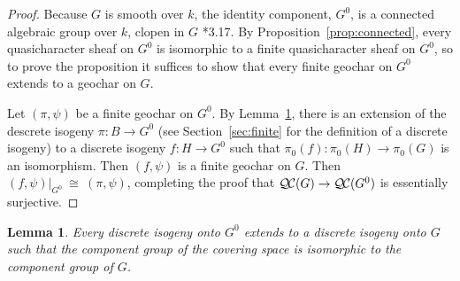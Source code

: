 \documentclass[11pt]{amsart}
\theoremstyle{plain}
\newtheorem{lemma}[theorem]{Lemma}
\theoremstyle{definition}
\theoremstyle{remark}
\newcommand{\Fq}{k}
\newcommand{\iso}{{\ \cong\ }}
\newcommand{\QC}{{\mathcal{Q\hskip-0.8pt C}}}
\begin{document}
\begin{proof}
  Because $G$ is smooth over $\Fq$, the identity component, 
  $G^0$, is a connected algebraic group over $\Fq$, 
  clopen in $G$ \cite{vdG&M}*{3.17}. 
  By Proposition~\ref{prop:connected}, every
  quasicharacter sheaf on $G^0$ is isomorphic to a 
  finite quasicharacter sheaf on $G^0$, 
  so to prove the proposition it suffices to show that every 
  finite geochar on $G^0$ extends to a geochar on $G$.
  
 Let $(\pi,\psi)$ be a finite geochar on $G^0$.
 By Lemma~\ref{lemma:ext}, there is an extension of the 
 descrete isogeny $\pi : B \to G^0$ 
 (see Section~\ref{sec:finite} for the definition of a discrete isogeny) 
 to a discrete isogeny $f : H \to G^0$ 
 such that $\pi_0(f) : \pi_0(H)\to \pi_0(G)$ is an isomorphism.
 Then $(f,\psi)$ is a finite geochar on $G$.
 Then $(f,\psi)\vert_{G^0} \iso (\pi,\psi)$,
 completing the proof that $\QC(G)\to \QC(G^0)$ is essentially surjective.
\end{proof}

\begin{lemma}\label{lemma:ext}
Every discrete isogeny onto $G^0$ extends to a discrete isogeny onto $G$ such that the component group of the covering space is isomorphic to the component group of $G$.
\end{lemma}
\end{document}
